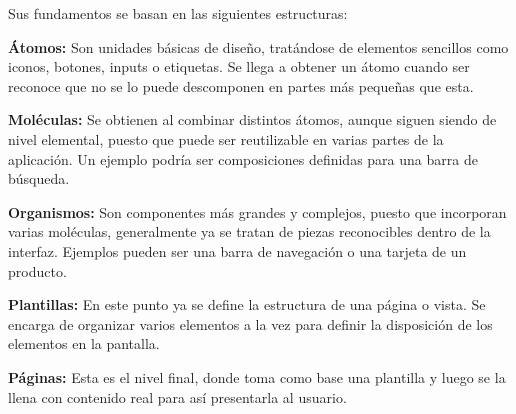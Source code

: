 Sus fundamentos se basan en las siguientes estructuras:

\textbf{Átomos:} Son unidades básicas de diseño, tratándose de elementos sencillos como iconos, botones, inputs o etiquetas. Se llega a obtener un átomo cuando ser reconoce que no se lo puede descomponen en partes más pequeñas que esta.

\textbf{Moléculas:} Se obtienen al combinar distintos átomos, aunque siguen siendo de nivel elemental, puesto que puede ser reutilizable en varias partes de la aplicación. Un ejemplo podría ser composiciones definidas para una barra de búsqueda.

\textbf{Organismos:} Son componentes más grandes y complejos, puesto que incorporan varias moléculas, generalmente ya se tratan de piezas reconocibles dentro de la interfaz. Ejemplos pueden ser una barra de navegación o una tarjeta de un producto.

\textbf{Plantillas:} En este punto ya se define la estructura de una página o vista. Se encarga de organizar varios elementos a la vez para definir la disposición de los elementos en la pantalla.

\textbf{Páginas:} Esta es el nivel final, donde toma como base una plantilla y luego se la llena con contenido real para así presentarla al usuario.
